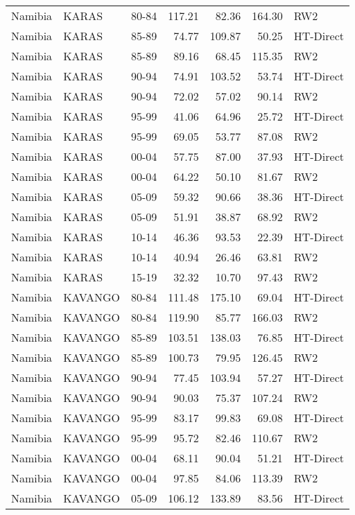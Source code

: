 \begin{longtable}{lllrrrl}
  Namibia & KARAS & 80-84 & 117.21 & 82.36 & 164.30 & RW2 \\ 
  Namibia & KARAS & 85-89 & 74.77 & 109.87 & 50.25 & HT-Direct \\ 
  Namibia & KARAS & 85-89 & 89.16 & 68.45 & 115.35 & RW2 \\ 
  Namibia & KARAS & 90-94 & 74.91 & 103.52 & 53.74 & HT-Direct \\ 
  Namibia & KARAS & 90-94 & 72.02 & 57.02 & 90.14 & RW2 \\ 
  Namibia & KARAS & 95-99 & 41.06 & 64.96 & 25.72 & HT-Direct \\ 
  Namibia & KARAS & 95-99 & 69.05 & 53.77 & 87.08 & RW2 \\ 
  Namibia & KARAS & 00-04 & 57.75 & 87.00 & 37.93 & HT-Direct \\ 
  Namibia & KARAS & 00-04 & 64.22 & 50.10 & 81.67 & RW2 \\ 
  Namibia & KARAS & 05-09 & 59.32 & 90.66 & 38.36 & HT-Direct \\ 
  Namibia & KARAS & 05-09 & 51.91 & 38.87 & 68.92 & RW2 \\ 
  Namibia & KARAS & 10-14 & 46.36 & 93.53 & 22.39 & HT-Direct \\ 
  Namibia & KARAS & 10-14 & 40.94 & 26.46 & 63.81 & RW2 \\ 
  Namibia & KARAS & 15-19 & 32.32 & 10.70 & 97.43 & RW2 \\ 
  Namibia & KAVANGO & 80-84 & 111.48 & 175.10 & 69.04 & HT-Direct \\ 
  Namibia & KAVANGO & 80-84 & 119.90 & 85.77 & 166.03 & RW2 \\ 
  Namibia & KAVANGO & 85-89 & 103.51 & 138.03 & 76.85 & HT-Direct \\ 
  Namibia & KAVANGO & 85-89 & 100.73 & 79.95 & 126.45 & RW2 \\ 
  Namibia & KAVANGO & 90-94 & 77.45 & 103.94 & 57.27 & HT-Direct \\ 
  Namibia & KAVANGO & 90-94 & 90.03 & 75.37 & 107.24 & RW2 \\ 
  Namibia & KAVANGO & 95-99 & 83.17 & 99.83 & 69.08 & HT-Direct \\ 
  Namibia & KAVANGO & 95-99 & 95.72 & 82.46 & 110.67 & RW2 \\ 
  Namibia & KAVANGO & 00-04 & 68.11 & 90.04 & 51.21 & HT-Direct \\ 
  Namibia & KAVANGO & 00-04 & 97.85 & 84.06 & 113.39 & RW2 \\ 
  Namibia & KAVANGO & 05-09 & 106.12 & 133.89 & 83.56 & HT-Direct \\ 

\end{longtable}
